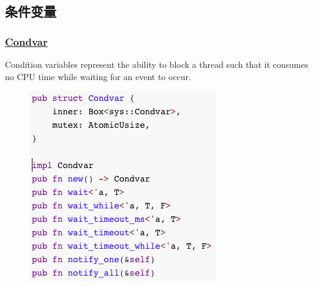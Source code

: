 % 
% 
% 
% 
% 
% 
\subsection{条件变量} %
\begin{frame}[fragile]
    \frametitle{\href{https://doc.rust-lang.org/std/sync/struct.Condvar.html}{Condvar}}

Condition variables represent the ability to block a thread such that it consumes no CPU time while waiting for an event to occur. \pause

    \begin{figure}
    \includegraphics[width=0.37\linewidth]{figs/struct-condvar.png}
    \end{figure}

\end{frame}
% 
% 
% 
% 
